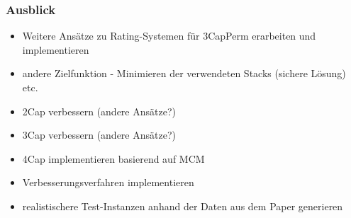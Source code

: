 \documentclass{beamer}
\begin{document}
\begin{frame}
\frametitle{Ausblick}
\begin{itemize}
  \item Weitere Ansätze zu Rating-Systemen für 3CapPerm erarbeiten und implementieren
  \item andere Zielfunktion - Minimieren der verwendeten Stacks (sichere Lösung) etc.
  \item 2Cap verbessern (andere Ansätze?)
  \item 3Cap verbessern (andere Ansätze?)
  \item 4Cap implementieren basierend auf MCM
  \item Verbesserungsverfahren implementieren
  \item realistischere Test-Instanzen anhand der Daten aus dem Paper generieren
\end{itemize}
\end{frame}



\end{document}
